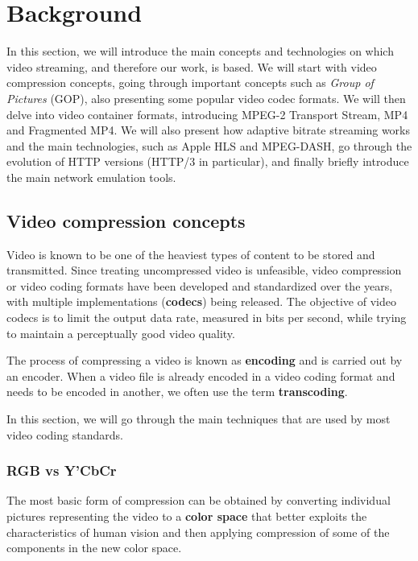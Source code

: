 \chapter{Background}
\label{cha:bg}

In this section, we will introduce the main concepts and technologies on which video streaming, and therefore our work, is based. We will start with video compression concepts, going through important concepts such as \textit{Group of Pictures} (GOP), also presenting some popular video codec formats. We will then delve into video container formats, introducing MPEG-2 Transport Stream, MP4 and Fragmented MP4. We will also present how adaptive bitrate streaming works and the main technologies, such as Apple HLS and MPEG-DASH, go through the evolution of HTTP versions (HTTP/3 in particular), and finally briefly introduce the main network emulation tools.

\section{Video compression concepts}
\label{sec:bg/compression}

Video is known to be one of the heaviest types of content to be stored and transmitted. Since treating uncompressed video is unfeasible, video compression or video coding formats have been developed and standardized over the years, with multiple implementations (\textbf{codecs}) being released. The objective of video codecs is to limit the output data rate, measured in bits per second, while trying to maintain a perceptually good video quality.

The process of compressing a video is known as \textbf{encoding} and is carried out by an encoder. When a video file is already encoded in a video coding format and needs to be encoded in another, we often use the term \textbf{transcoding}.

In this section, we will go through the main techniques that are used by most video coding standards.

\subsection{RGB vs Y'CbCr}
\label{sec:bg/compression/ycbcr}

The most basic form of compression can be obtained by converting individual pictures representing the video to a \textbf{color space} that better exploits the characteristics of human vision and then applying compression of some of the components in the new color space.

